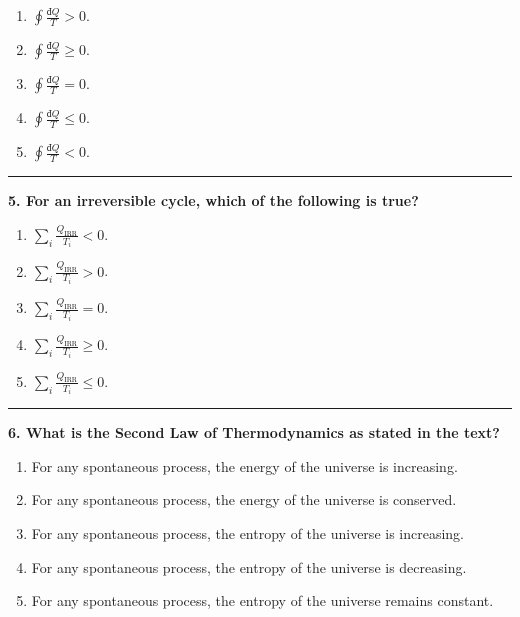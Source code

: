 \documentclass[
  9pt,
]{extbook}
\providecommand{\tightlist}{%
  \setlength{\itemsep}{0pt}\setlength{\parskip}{0pt}}
\theoremstyle{definition}
\theoremstyle{definition}
\theoremstyle{definition}
\theoremstyle{definition}
\theoremstyle{remark}
\begin{document}
\begin{enumerate}
\def\labelenumi{\alph{enumi}.}
\tightlist
\item
  \(\oint \frac{đQ}{T} > 0\).
\item
  \(\oint \frac{đQ}{T} \geq 0\).
\item
  \(\oint \frac{đQ}{T} = 0\).
\item
  \(\oint \frac{đQ}{T} \leq 0\).
\item
  \(\oint \frac{đQ}{T} < 0\).
\end{enumerate}

\begin{center}\rule{0.5\linewidth}{0.5pt}\end{center}

\textbf{5. For an irreversible cycle, which of the following is true?}

\begin{enumerate}
\def\labelenumi{\alph{enumi}.}
\tightlist
\item
  \(\sum_i \frac{Q_{\text{IRR}}}{T_i} < 0\).
\item
  \(\sum_i \frac{Q_{\text{IRR}}}{T_i} > 0\).
\item
  \(\sum_i \frac{Q_{\text{IRR}}}{T_i} = 0\).
\item
  \(\sum_i \frac{Q_{\text{IRR}}}{T_i} \geq 0\).
\item
  \(\sum_i \frac{Q_{\text{IRR}}}{T_i} \leq 0\).
\end{enumerate}

\begin{center}\rule{0.5\linewidth}{0.5pt}\end{center}

\textbf{6. What is the Second Law of Thermodynamics as stated in the text?}

\begin{enumerate}
\def\labelenumi{\alph{enumi}.}
\tightlist
\item
  For any spontaneous process, the energy of the universe is increasing.
\item
  For any spontaneous process, the energy of the universe is conserved.
\item
  For any spontaneous process, the entropy of the universe is increasing.
\item
  For any spontaneous process, the entropy of the universe is decreasing.
\item
  For any spontaneous process, the entropy of the universe remains constant.
\end{enumerate}
\end{document}
